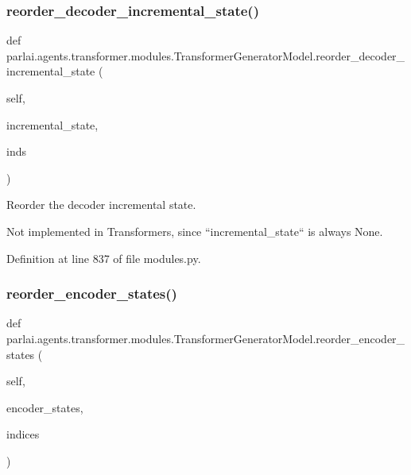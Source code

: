 \subsubsection{\texorpdfstring{reorder\+\_\+decoder\+\_\+incremental\+\_\+state()}{reorder\_decoder\_incremental\_state()}}
{\footnotesize\ttfamily def parlai.\+agents.\+transformer.\+modules.\+Transformer\+Generator\+Model.\+reorder\+\_\+decoder\+\_\+incremental\+\_\+state (\begin{DoxyParamCaption}\item[{}]{self,  }\item[{}]{incremental\+\_\+state,  }\item[{}]{inds }\end{DoxyParamCaption})}

\begin{DoxyVerb}Reorder the decoder incremental state.

Not implemented in Transformers, since ``incremental_state`` is always None.
\end{DoxyVerb}
 

Definition at line 837 of file modules.\+py.

\mbox{\label{classparlai_1_1agents_1_1transformer_1_1modules_1_1TransformerGeneratorModel_a9b9261bca59f10692c15cbaaa3ffce65}} 
\subsubsection{\texorpdfstring{reorder\+\_\+encoder\+\_\+states()}{reorder\_encoder\_states()}}
{\footnotesize\ttfamily def parlai.\+agents.\+transformer.\+modules.\+Transformer\+Generator\+Model.\+reorder\+\_\+encoder\+\_\+states (\begin{DoxyParamCaption}\item[{}]{self,  }\item[{}]{encoder\+\_\+states,  }\item[{}]{indices }\end{DoxyParamCaption})}

